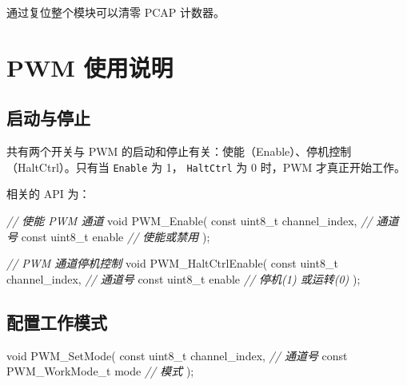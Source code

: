 \documentclass[
  12pt,
]{book}
\newenvironment{Shaded}{\begin{snugshade}}{\end{snugshade}}
\newcommand{\CommentTok}[1]{\textcolor[rgb]{0.56,0.35,0.01}{\textit{#1}}}
\newcommand{\DataTypeTok}[1]{\textcolor[rgb]{0.13,0.29,0.53}{#1}}
\newcommand{\NormalTok}[1]{#1}
\begin{document}
通过复位整个模块可以清零 PCAP 计数器。

\hypertarget{pwm-ux4f7fux7528ux8bf4ux660e}{%
\section{PWM 使用说明}\label{pwm-ux4f7fux7528ux8bf4ux660e}}

\hypertarget{ux542fux52a8ux4e0eux505cux6b62}{%
\subsection{启动与停止}\label{ux542fux52a8ux4e0eux505cux6b62}}

共有两个开关与 PWM 的启动和停止有关：使能（Enable）、停机控制（HaltCtrl）。只有当 \texttt{Enable} 为 1，
\texttt{HaltCtrl} 为 0 时，PWM 才真正开始工作。

相关的 API 为：

\begin{Shaded}
\begin{Highlighting}[]
\CommentTok{// 使能 PWM 通道}
\DataTypeTok{void}\NormalTok{ PWM_Enable(}
    \DataTypeTok{const} \DataTypeTok{uint8_t}\NormalTok{ channel_index,    }\CommentTok{// 通道号}
    \DataTypeTok{const} \DataTypeTok{uint8_t}\NormalTok{ enable            }\CommentTok{// 使能或禁用}
\NormalTok{    );}

\CommentTok{// PWM 通道停机控制}
\DataTypeTok{void}\NormalTok{ PWM_HaltCtrlEnable(}
    \DataTypeTok{const} \DataTypeTok{uint8_t}\NormalTok{ channel_index,    }\CommentTok{// 通道号}
    \DataTypeTok{const} \DataTypeTok{uint8_t}\NormalTok{ enable            }\CommentTok{// 停机(1) 或运转(0)}
\NormalTok{    );}
\end{Highlighting}
\end{Shaded}

\hypertarget{ux914dux7f6eux5de5ux4f5cux6a21ux5f0f}{%
\subsection{配置工作模式}\label{ux914dux7f6eux5de5ux4f5cux6a21ux5f0f}}

\begin{Shaded}
\begin{Highlighting}[]
\DataTypeTok{void}\NormalTok{ PWM_SetMode(}
    \DataTypeTok{const} \DataTypeTok{uint8_t}\NormalTok{ channel_index,    }\CommentTok{// 通道号}
    \DataTypeTok{const}\NormalTok{ PWM_WorkMode_t mode       }\CommentTok{// 模式}
\NormalTok{    );}
\end{Highlighting}
\end{Shaded}
\end{document}
